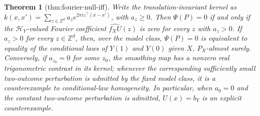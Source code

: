 \documentclass{article}
\newtheorem{theorem}{Theorem}
\begin{document}
\begin{theorem}[thm:fourier-null-iff]\label{thm:fourier-null-iff}
Write the translation-invariant kernel as \(k(x,x')=\sum_{z\in\mathbb Z^d}a_z e^{2\pi i z^\top(x-x')}\), with \(a_z\ge0\). Then \(\Psi(P)=0\) if and only if the \(\mathcal H_Y\)-valued Fourier coefficient \(\widehat{f_XU}(z)\) is zero for every \(z\) with \(a_z>0\). If \(a_z>0\) for every \(z\in\mathbb Z^d\), then, over the model class, \(\Psi(P)=0\) is equivalent to equality of the conditional laws of \(Y(1)\) and \(Y(0)\) given \(X\), \(P_X\)-almost surely. Conversely, if \(a_{z_0}=0\) for some \(z_0\), the smoothing map has a nonzero real trigonometric contrast in its kernel; whenever the corresponding sufficiently small two-outcome perturbation is admitted by the fixed model class, it is a counterexample to conditional-law homogeneity. In particular, when \(a_0=0\) and the constant two-outcome perturbation is admitted, \(U(x)=b_Y\) is an explicit counterexample.
\end{theorem}
\end{document}
